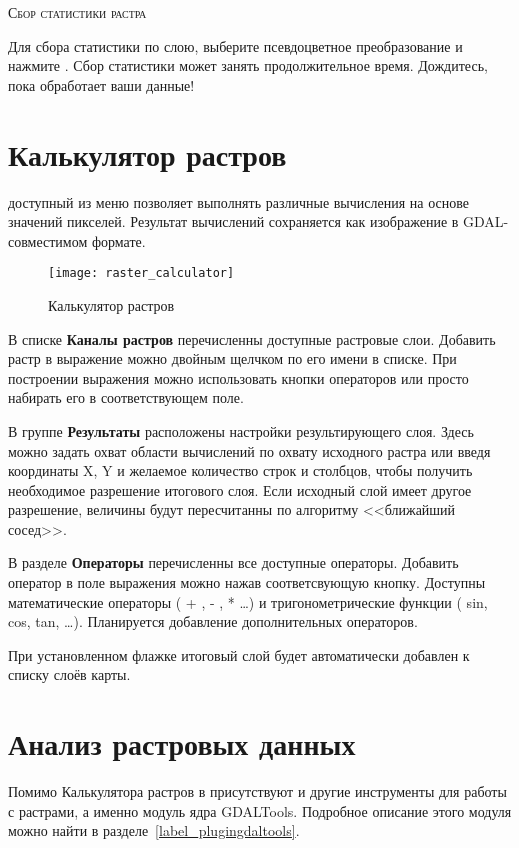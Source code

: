 \begin{Tip}\caption{\textsc{Сбор статистики растра}}
Для сбора статистики по слою, выберите псевдоцветное преобразование и
нажмите . Сбор статистики может занять продолжительное
время. Дождитесь, пока \qg обработает ваши данные!
\end{Tip}

\section{Калькулятор растров}\label{sec:raster_calc}

 доступный из меню  позволяет
выполнять различные вычисления на основе значений пикселей. Результат
вычислений сохраняется как изображение в GDAL-совместимом формате.

\begin{figure}[ht]
  \centering
    \texttt{[image: raster\_calculator]}
    \caption{Калькулятор растров \wincaption}\label{fig:raster_calculator}
\end{figure}

В списке \textbf{Каналы растров} перечисленны доступные растровые слои.
Добавить растр в выражение можно двойным щелчком по его имени в списке.
При построении выражения можно использовать кнопки операторов или просто
набирать его в соответствующем поле.

В группе \textbf{Результаты} расположены настройки результирующего слоя.
Здесь можно задать охват области вычислений по охвату исходного растра или
введя координаты X, Y и желаемое количество строк и столбцов, чтобы получить
необходимое разрешение итогового слоя. Если исходный слой имеет другое
разрешение, величины будут пересчитанны по алгоритму <<ближайший сосед>>.

В разделе \textbf{Операторы} перечисленны все доступные операторы. Добавить
оператор в поле выражения можно нажав соответсвующую кнопку. Доступны
математические операторы ( + , - , * \dots) и тригонометрические функции
( sin, cos, tan, \dots). Планируется добавление дополнительных операторов.

При установленном флажке  итоговый слой
будет автоматически добавлен к списку слоёв карты.

\section{Анализ растровых данных}\label{sec:raster_analysis}

Помимо Калькулятора растров в \qg \CURRENT присутствуют и другие инструменты
для работы с растрами, а именно модуль ядра GDALTools. Подробное описание
этого модуля можно найти в разделе~\ref{label_plugingdaltools}.

\FloatBarrier
